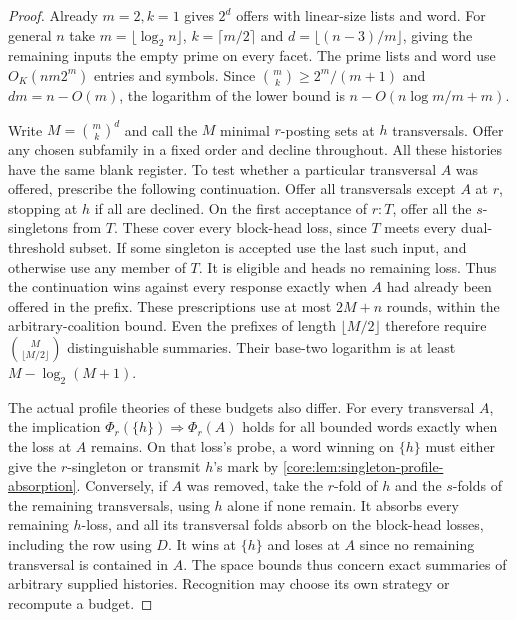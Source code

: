 \begin{proof}
Already $m=2,k=1$ gives $2^d$ offers with linear-size lists and word.
For general $n$ take $m=\lfloor\log_2 n\rfloor$,
$k=\lceil m/2\rceil$ and $d=\lfloor(n-3)/m\rfloor$, giving the
remaining inputs the empty prime on every facet. The prime lists
and word use $O_K(nm2^m)$ entries and symbols. Since
$\binom mk\ge2^m/(m+1)$ and $dm=n-O(m)$, the logarithm of the
lower bound is $n-O(n\log m/m+m)$.

Write $M=\binom{m}{k}^{d}$ and call the $M$ minimal $r$-posting
sets at $h$ transversals. Offer any chosen subfamily in a fixed
order and decline throughout. All these histories have the same
blank register. To test whether a particular transversal $A$ was
offered, prescribe the following continuation. Offer all
transversals except $A$ at $r$, stopping at $h$ if all are
declined. On the first acceptance of $r:T$, offer all the
$s$-singletons from $T$. These cover every block-head loss, since
$T$ meets every dual-threshold subset. If some singleton is
accepted use the last such input, and otherwise use any member of
$T$. It is eligible and heads no remaining loss. Thus the continuation
wins against every response exactly when $A$ had already been
offered in the prefix. These prescriptions use at most $2M+n$
rounds, within the arbitrary-coalition bound. Even the prefixes of
length $\lfloor M/2\rfloor$ therefore require
$\binom{M}{\lfloor M/2\rfloor}$ distinguishable summaries. Their
base-two logarithm is at least $M-\log_2(M+1)$.

The actual profile theories of these budgets also differ. For every
transversal $A$, the implication
$\Phi_r(\{h\})\Rightarrow\Phi_r(A)$ holds for all bounded words
exactly when the loss at $A$ remains. On that loss's probe, a word
winning on $\{h\}$ must either give the $r$-singleton or transmit
$h$'s mark by \cref{core:lem:singleton-profile-absorption}.
Conversely, if $A$ was removed, take the $r$-fold of $h$ and the
$s$-folds of the remaining transversals, using $h$ alone if none
remain. It absorbs every remaining $h$-loss, and all its transversal
folds absorb on the block-head losses, including the row using $D$.
It wins at $\{h\}$ and loses at $A$ since no remaining transversal
is contained in $A$. The space bounds thus concern exact summaries
of arbitrary supplied histories. Recognition may choose its own
strategy or recompute a budget.
\end{proof}

